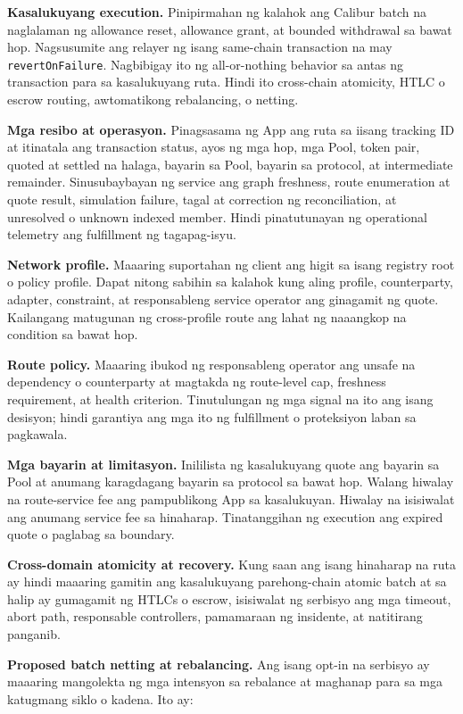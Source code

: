 \documentclass[11pt]{article}
\begin{document}
\textbf{Kasalukuyang execution.} Pinipirmahan ng kalahok ang Calibur batch na naglalaman ng allowance reset, allowance grant, at bounded withdrawal sa bawat hop. Nagsusumite ang relayer ng isang same-chain transaction na may \texttt{revertOnFailure}. Nagbibigay ito ng all-or-nothing behavior sa antas ng transaction para sa kasalukuyang ruta. Hindi ito cross-chain atomicity, HTLC o escrow routing, awtomatikong rebalancing, o netting.

\textbf{Mga resibo at operasyon.} Pinagsasama ng App ang ruta sa iisang tracking ID at itinatala ang transaction status, ayos ng mga hop, mga Pool, token pair, quoted at settled na halaga, bayarin sa Pool, bayarin sa protocol, at intermediate remainder. Sinusubaybayan ng service ang graph freshness, route enumeration at quote result, simulation failure, tagal at correction ng reconciliation, at unresolved o unknown indexed member. Hindi pinatutunayan ng operational telemetry ang fulfillment ng tagapag-isyu.

\textbf{Network profile.} Maaaring suportahan ng client ang higit sa isang registry root o policy profile. Dapat nitong sabihin sa kalahok kung aling profile, counterparty, adapter, constraint, at responsableng service operator ang ginagamit ng quote. Kailangang matugunan ng cross-profile route ang lahat ng naaangkop na condition sa bawat hop.

\textbf{Route policy.} Maaaring ibukod ng responsableng operator ang unsafe na dependency o counterparty at magtakda ng route-level cap, freshness requirement, at health criterion. Tinutulungan ng mga signal na ito ang isang desisyon; hindi garantiya ang mga ito ng fulfillment o proteksiyon laban sa pagkawala.

\textbf{Mga bayarin at limitasyon.} Inililista ng kasalukuyang quote ang bayarin sa Pool at anumang karagdagang bayarin sa protocol sa bawat hop. Walang hiwalay na route-service fee ang pampublikong App sa kasalukuyan. Hiwalay na isisiwalat ang anumang service fee sa hinaharap. Tinatanggihan ng execution ang expired quote o paglabag sa boundary.

\textbf{Cross-domain atomicity at recovery.} Kung saan ang isang hinaharap na ruta ay hindi maaaring gamitin ang kasalukuyang parehong-chain atomic batch at sa halip ay gumagamit ng HTLCs o escrow, isisiwalat ng serbisyo ang mga timeout, abort path, responsable controllers, pamamaraan ng insidente, at natitirang panganib.

\textbf{Proposed batch netting at rebalancing.} Ang isang opt-in na serbisyo ay maaaring mangolekta ng mga intensyon sa rebalance at maghanap para sa mga katugmang siklo o kadena. Ito ay:
\end{document}
